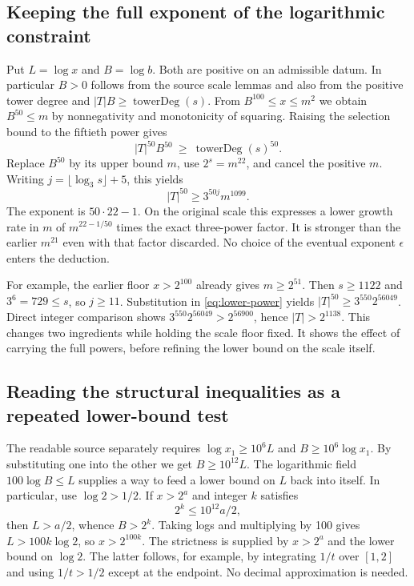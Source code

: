 \documentclass[12pt,letterpaper]{article}
\begin{document}
\subsection{Keeping the full exponent of the logarithmic constraint}
Put $L=\log x$ and $B=\log b$. Both are positive on an admissible datum. In particular $B>0$ follows from the source scale lemmas and also from the positive tower degree and $|T|B\ge\operatorname{towerDeg}(s)$. From $B^{100}\le x\le m^2$ we obtain $B^{50}\le m$ by nonnegativity and monotonicity of squaring. Raising the selection bound to the fiftieth power gives
\[
 |T|^{50}B^{50} \ \ge\ \operatorname{towerDeg}(s)^{50}.
\]
Replace $B^{50}$ by its upper bound $m$, use $2^s=m^{22}$, and cancel the positive $m$. Writing $j=\lfloor\log_3s\rfloor+5$, this yields
\begin{equation}\label{eq:lower-power}
                     |T|^{50}\ge 3^{50j}m^{1099}.
\end{equation}
The exponent is $50\cdot22-1$. On the original scale this expresses a lower growth rate in $m$ of $m^{22-1/50}$ times the exact three-power factor. It is stronger than the earlier $m^{21}$ even with that factor discarded. No choice of the eventual exponent $\epsilon$ enters the deduction.

For example, the earlier floor $x>2^{100}$ already gives $m\ge2^{51}$. Then $s\ge1122$ and $3^6=729\le s$, so $j\ge11$. Substitution in \eqref{eq:lower-power} yields $|T|^{50}\ge3^{550}2^{56049}$. Direct integer comparison shows $3^{550}2^{56049}>2^{56900}$, hence $|T|>2^{1138}$. This changes two ingredients while holding the scale floor fixed. It shows the effect of carrying the full powers, before refining the lower bound on the scale itself.

\subsection{Reading the structural inequalities as a repeated lower-bound test}
The readable source separately requires $\log x_1\ge10^6 L$ and $B\ge10^6\log x_1$. By substituting one into the other we get $B\ge10^{12}L$. The logarithmic field $100\log B\le L$ supplies a way to feed a lower bound on $L$ back into itself. In particular, use $\log2>1/2$. If $x>2^a$ and integer $k$ satisfies
\[
                              2^k\le10^{12}a/2,
\]
then $L>a/2$, whence $B>2^k$. Taking logs and multiplying by 100 gives $L>100k\log2$, so $x>2^{100k}$. The strictness is supplied by $x>2^a$ and the lower bound on $\log2$. The latter follows, for example, by integrating $1/t$ over $[1,2]$ and using $1/t>1/2$ except at the endpoint. No decimal approximation is needed.
\end{document}
